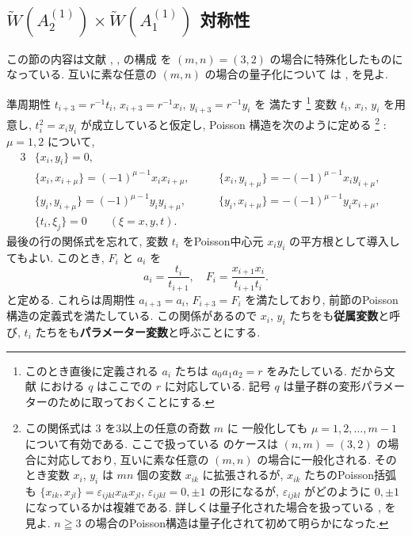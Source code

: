 \documentclass[12pt,twoside,dvipdfm]{msjproc}
\theoremstyle{definition} %
\theoremstyle{definition} %
\theoremstyle{definition} %
\numberwithin{theorem}{section}
\numberwithin{equation}{section}
\numberwithin{figure}{section}
\numberwithin{table}{section}
\newcommand\qP[1]{{\text{$q\mathrm{P}_{\text{#1}}$}}}
\newcommand\eps{\varepsilon}
\newcommand\WW{\widetilde{W}}
\begin{document}
\subsection{$\WW(A^{(1)}_2)\times\WW(A^{(1)}_1)$ 対称性}

この節の内容は文献 \cite{KNY-WxW}, \cite{KNY-qKP}, \cite{NY-RSK} の構成
を $(m,n)=(3,2)$ の場合に特殊化したものになっている.
互いに素な任意の $(m,n)$ の場合の量子化について
は \cite{Kuroki-WxW2010}, \cite{Kuroki-WxW2013} を見よ.

準周期性 $t_{i+3}=r^{-1} t_i$, $x_{i+3}=r^{-1} x_i$, $y_{i+3}=r^{-1} y_i$ を
満たす%
\footnote{このとき直後に定義される $a_i$ たちは $a_0a_1a_2=r$ をみたしている.
だから文献 \cite{KNY-qPIV} における $q$ はここでの $r$ に対応している.
記号 $q$ は量子群の変形パラメーターのために取っておくことにする.}%
変数 $t_i$, $x_i$, $y_i$ を用意し, 
$t_i^2 = x_i y_i$ が成立していると仮定し, 
Poisson 構造を次のように定める%
\footnote{この関係式は $3$ を3以上の任意の奇数 $m$ に
一般化しても $\mu=1,2,\dots,m-1$ について有効である.
ここで扱っている \qP{IV} のケースは $(n,m)=(3,2)$ の場合に対応しており, 
互いに素な任意の $(m,n)$ の場合に一般化される. 
そのとき変数 $x_i$, $y_i$ は $mn$ 個の変数 $x_{ik}$ に拡張されるが, 
$x_{ik}$ たちのPoisson括弧
も $\{x_{ik},x_{jl}\}=\eps_{ijkl} x_{ik}x_{jl}$, $\eps_{ijkl}=0,\pm1$ の形になるが, 
$\eps_{ijkl}$ がどのように $0,\pm1$ になっているかは複雑である.
詳しくは量子化された場合を扱っている \cite{Kuroki-WxW2010}, \cite{Kuroki-WxW2013} を見よ.
$n\geqq 3$ の場合のPoisson構造は量子化されて初めて明らかになった.}%
: $\mu=1,2$ について, 
\begin{alignat*}{3}
 &
 \{x_i, y_i\}=0, \quad
 \\ &
 \{x_i,x_{i+\mu}\} = (-1)^{\mu-1} x_i x_{i+\mu}, \quad
 & &
 \{x_i,y_{i+\mu}\} = - (-1)^{\mu-1} x_i y_{i+\mu}, \quad
 \\ &
 \{y_i,y_{i+\mu}\} = (-1)^{\mu-1} y_i y_{i+\mu}, \quad
 & &
 \{y_i,x_{i+\mu}\} = - (-1)^{\mu-1} y_i x_{i+\mu}, \quad
 \\ &
 \{t_i, \xi_j\}=0 \qquad (\xi=x,y,t).
\end{alignat*}
最後の行の関係式を忘れて, 変数 $t_i$ をPoisson中心元 $x_i y_i$ の平方根として導入してもよい.
このとき, $F_i$ と $a_i$ を
\begin{equation*}
 a_i = \frac{t_i}{t_{i+1}}, \quad F_i = \frac{x_{i+1}x_i}{t_{i+1}t_i}.
\end{equation*}
と定める. これらは周期性 $a_{i+3}=a_i$, $F_{i+3}=F_i$ を満たしており, 
前節のPoisson構造の定義式を満たしている.
この関係があるので $x_i$, $y_i$ たちをも{\bf 従属変数}と呼び, 
$t_i$ たちをも{\bf パラメーター変数}と呼ぶことにする.
\end{document}
